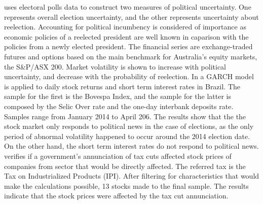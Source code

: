 \documentclass[a4paper]{article}
\begin{document}
\citet{smales2015} uses electoral polls data to construct two measures of political uncertainty. One represents overall election uncertainty, and the other represents uncertainty about reelection. Accounting for political incumbency is considered of importance as economic policies of a reelected president are well known in caparison with the policies from a newly elected president. The financial series are exchange-traded futures and options based on the main benchmark for Australia's equity markets, the S\&P/ASX 200. Market volatility is shown to increase with political uncertainty, and decrease with the probability of reelection.
In \citet{marquessantos2016} a GARCH model is applied to daily stock returns and short term interest rates in Brazil. The sample for the first is the Bovespa Index, and the sample for the latter is composed by the Selic Over rate and the one-day interbank deposits rate. Samples range from January 2014 to April 206. The results show that the the stock market only responds to political news in the case of elections, as the only period of abnormal volatility happened to occur around the 2014 election date. On the other hand, the short term interest rates do not respond to political news.
\cite{gabrielribeiro2013} verifies if a government's annunciation of tax cuts affected stock prices of companies from sector that would be directly affected. The referred tax is the Tax on Industrialized Products (IPI). After filtering for characteristics that would make the calculations possible, 13 stocks made to the final sample. The results indicate that the stock prices were affected by the tax cut annunciation.
\end{document}
